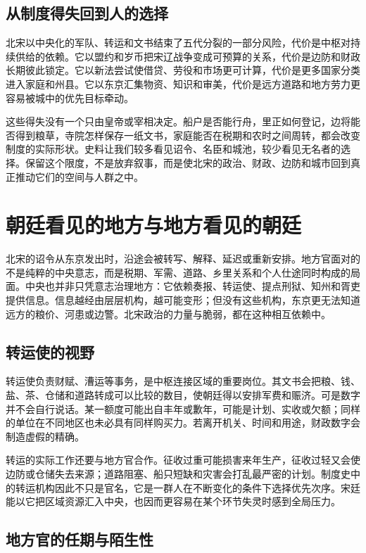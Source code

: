 \subsection{从制度得失回到人的选择}

北宋以中央化的军队、转运和文书结束了五代分裂的一部分风险，代价是中枢对持续供给的依赖。它以盟约和岁币把宋辽战争变成可预算的关系，代价是边防和财政长期彼此锁定。它以新法尝试使借贷、劳役和市场更可计算，代价是更多国家分类进入家庭和州县。它以东京汇集物资、知识和审美，代价是远方道路和地方劳力更容易被城中的优先目标牵动。

这些得失没有一个只由皇帝或宰相决定。船户是否能行舟，里正如何登记，边将能否得到粮草，寺院怎样保存一纸文书，家庭能否在税期和农时之间周转，都会改变制度的实际形状。史料让我们较多看见诏令、名臣和城池，较少看见无名者的选择。保留这个限度，不是放弃叙事，而是使北宋的政治、财政、边防和城市回到真正推动它们的空间与人群之中。

\section{朝廷看见的地方与地方看见的朝廷}

北宋的诏令从东京发出时，沿途会被转写、解释、延迟或重新安排。地方官面对的不是纯粹的中央意志，而是税期、军需、道路、乡里关系和个人仕途同时构成的局面。中央也并非只凭意志治理地方：它依赖奏报、转运使、提点刑狱、知州和胥吏提供信息。信息越经由层层机构，越可能变形；但没有这些机构，东京更无法知道远方的粮价、河患或边警。北宋政治的力量与脆弱，都在这种相互依赖中。

\subsection{转运使的视野}

转运使负责财赋、漕运等事务，是中枢连接区域的重要岗位。其文书会把粮、钱、盐、茶、仓储和道路转成可以比较的数目，使朝廷得以安排军费和赈济。可是数字并不会自行说话。某一额度可能出自丰年或歉年，可能是计划、实收或欠额；同样的单位在不同地区也未必具有同样购买力。若离开机关、时间和用途，财政数字会制造虚假的精确。

转运的实际工作还要与地方官合作。征收过重可能损害来年生产，征收过轻又会使边防或仓储失去来源；道路阻塞、船只短缺和灾害会打乱最严密的计划。制度史中的转运机构因此不只是官名，它是一群人在不断变化的条件下选择优先次序。宋廷能以它把区域资源汇入中央，也因而更容易在某个环节失灵时感到全局压力。

\subsection{地方官的任期与陌生性}

